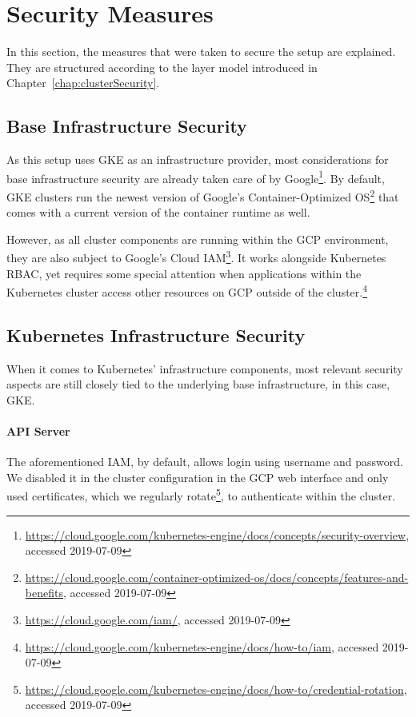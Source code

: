 \section{Security Measures}

In this section, the measures that were taken to secure the setup are explained. They are structured according to the layer model introduced in Chapter~\ref{chap:clusterSecurity}.

\subsection{Base Infrastructure Security}

As this setup uses \ac{GKE} as an infrastructure provider, most considerations for base infrastructure security are already taken care of by Google\footnote{\url{https://cloud.google.com/kubernetes-engine/docs/concepts/security-overview}, accessed 2019-07-09}. By default, \ac{GKE} clusters run the newest version of Google's Container-Optimized OS\footnote{\url{https://cloud.google.com/container-optimized-os/docs/concepts/features-and-benefits}, accessed 2019-07-09} that comes with a current version of the container runtime as well. 

However, as all cluster components are running within the \ac{GCP} environment, they are also subject to Google's Cloud \ac{IAM}\footnote{\url{https://cloud.google.com/iam/}, accessed 2019-07-09}. It works alongside Kubernetes \ac{RBAC}, yet requires some special attention when applications within the Kubernetes cluster access other resources on \ac{GCP} outside of the cluster.\footnote{\url{https://cloud.google.com/kubernetes-engine/docs/how-to/iam}, accessed 2019-07-09}

\subsection{Kubernetes Infrastructure Security}

When it comes to Kubernetes' infrastructure components, most relevant security aspects are still closely tied to the underlying base infrastructure, in this case, \ac{GKE}.

\paragraph{API Server}

The aforementioned \ac{IAM}, by default, allows login using username and password. We disabled it in the cluster configuration in the \ac{GCP} web interface and only used certificates, which we regularly rotate\footnote{\url{https://cloud.google.com/kubernetes-engine/docs/how-to/credential-rotation}, accessed 2019-07-09}, to authenticate within the cluster.

